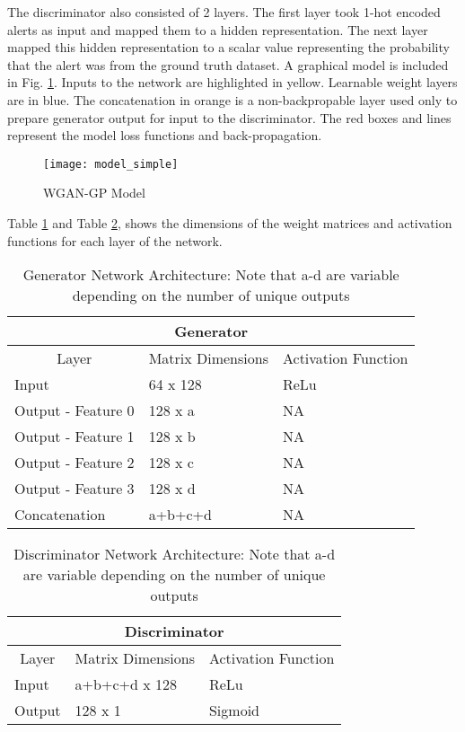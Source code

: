 The discriminator also consisted of 2 layers. The first layer took 1-hot encoded alerts as input and mapped them to a hidden representation. The next layer mapped this hidden representation to a scalar value representing the probability that the alert was from the ground truth dataset. A graphical model is included in Fig. \ref{fig:model_simple}. Inputs to the network are highlighted in yellow. Learnable weight layers are in blue. The concatenation in orange is a non-backpropable layer used only to prepare generator output for input to the discriminator. The red boxes and lines represent the model loss functions and back-propagation.

\begin{figure}[!htbp]
	\centering%
	\texttt{[image: model\_simple]}
	\caption{WGAN-GP Model}
	\label{fig:model_simple}
\end{figure}

Table \ref{tab:model_simple_a} and Table \ref{tab:model_simple_b}, shows the dimensions of the weight matrices and activation functions for each layer of the network.

\begin{table}[!htbp]
	\centering
	\caption{Generator Network Architecture: Note that a-d are variable depending on the number of unique outputs}
	\label{tab:model_simple_a}
	\begin{tabular}{l|l|l}
		\hline
		\multicolumn{3}{c}{\textbf{Generator}} \\ 
		\hline
		\multicolumn{1}{c|}{Layer} & \multicolumn{1}{c|}{Matrix Dimensions} & \multicolumn{1}{c}{Activation Function} \\ \hline
		Input & 64 x 128 & ReLu \\
		Output - Feature 0 & 128 x a & NA \\
		Output - Feature 1 & 128 x b & NA \\
		Output - Feature 2 & 128 x c & NA \\
		Output  - Feature 3 & 128 x d & NA \\
		Concatenation & a+b+c+d & NA \\
		\hline
	\end{tabular}
\end{table}

\begin{table}[!htbp]
	\centering
	\caption{Discriminator Network Architecture: Note that a-d are variable depending on the number of unique outputs}
	\label{tab:model_simple_b}
	\begin{tabular}{l|l|l}
		\hline
		\multicolumn{3}{c}{\textbf{Discriminator}} \\ 
		\hline
		\multicolumn{1}{c|}{Layer} & \multicolumn{1}{c|}{Matrix Dimensions} & \multicolumn{1}{c}{Activation Function} \\ \hline
		Input & a+b+c+d x 128 & ReLu \\
		Output & 128 x 1 & Sigmoid \\
		\hline
	\end{tabular}
\end{table}


